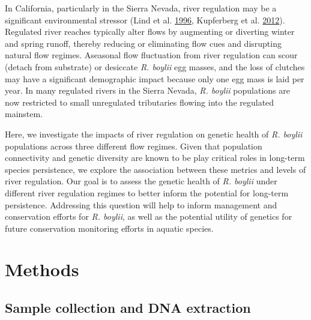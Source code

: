 \documentclass[proquest,12pt,final]{ucthesis-CA2012} %
\begin{document}
\begin{ucmainmatter}
In California, particularly in the Sierra Nevada, river regulation may
be a significant environmental stressor (Lind et al.
\protect\hyperlink{ref-lind_effects_1996}{1996}, Kupferberg et al.
\protect\hyperlink{ref-kupferberg_effects_2012}{2012}). Regulated river
reaches typically alter flows by augmenting or diverting winter and
spring runoff, thereby reducing or eliminating flow cues and disrupting
natural flow regimes. Aseasonal flow fluctuation from river regulation
can scour (detach from substrate) or desiccate \emph{R. boylii} egg
masses, and the loss of clutches may have a significant demographic
impact because only one egg mass is laid per year. In many regulated
rivers in the Sierra Nevada, \emph{R. boylii} populations are now
restricted to small unregulated tributaries flowing into the regulated
mainstem.

\par

Here, we investigate the impacts of river regulation on genetic health
of \emph{R. boylii} populations across three different flow regimes.
Given that population connectivity and genetic diversity are known to be
play critical roles in long-term species persistence, we explore the
association between these metrics and levels of river regulation. Our
goal is to assess the genetic health of \emph{R. boylii} under different
river regulation regimes to better inform the potential for long-term
persistence. Addressing this question will help to inform management and
conservation efforts for \emph{R. boylii}, as well as the potential
utility of genetics for future conservation monitoring efforts in
aquatic species.

\hypertarget{methods}{%
\section{Methods}\label{methods}}

\hypertarget{ch1samplecollection}{%
\subsection{Sample collection and DNA
extraction}\label{ch1samplecollection}}


\end{ucmainmatter}
\end{document}
